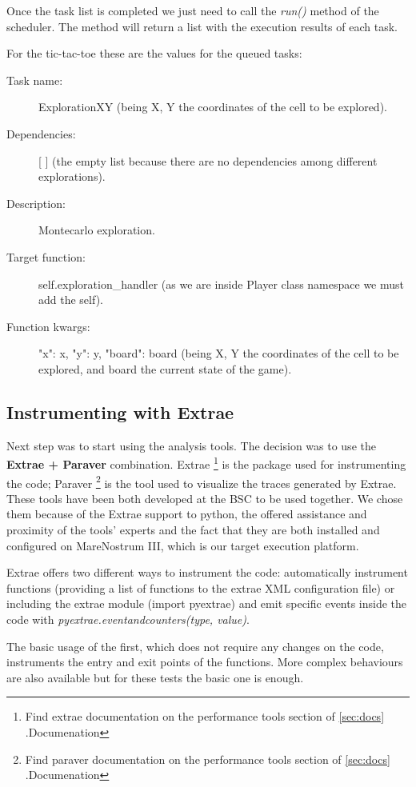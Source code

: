 Once the task list is completed we just need to call the \textit{run()} method of the scheduler. The method will return a list with the execution results of each task.

For the tic-tac-toe these are the values for the queued tasks:

\begin{description}
\item [Task name:] ExplorationXY (being X, Y the coordinates of the cell to be explored).
\item [Dependencies:] [ ] (the empty list because there are no dependencies among different explorations).
\item [Description:] Montecarlo exploration.
\item [Target function:] self.exploration\_handler (as we are inside Player class namespace we must add the self).
\item [Function kwargs:] {"x": x, "y": y, "board": board} (being X, Y the coordinates of the cell to be explored, and board the current state of the game).
\end{description}

\subsection{Instrumenting with Extrae}

Next step was to start using the analysis tools. The decision was to use the  \textbf{Extrae + Paraver} combination. Extrae \footnote{ Find extrae documentation on the performance tools section of \ref{sec:docs} .Documenation} is the package used for instrumenting the code; Paraver \footnote{ Find paraver documentation on the performance tools section of \ref{sec:docs} .Documenation} is the tool used to visualize the traces generated by Extrae. These tools have been both developed at the BSC to be used together. We chose them because of the Extrae support to python, the offered assistance and proximity of the tools' experts and the fact that they are both installed and configured on MareNostrum III, which is our target execution platform.

Extrae offers two different ways to instrument the code: automatically instrument functions (providing a list of functions to the extrae XML configuration file) or including the extrae module (import pyextrae)  and emit specific events inside the code with \textit{pyextrae.eventandcounters(type, value)}. 

The basic usage of the first, which  does not require any changes on the code, instruments the entry and exit points of the functions. More complex behaviours are also available but for these tests the basic one is enough. 


